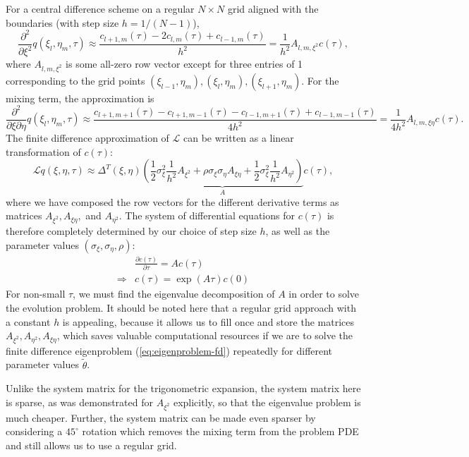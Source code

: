 \documentclass[10pt]{article}
\begin{document}
For a central difference scheme on a regular $N \times N$ grid aligned
with the boundaries (with step size $h=1/(N-1)$), 
\[
  \frac{\partial^2}{\partial \xi^2} q(\xi_l, \eta_m, \tau) \approx
  \frac{c_{l+1,m}(\tau) - 2c_{l,m}(\tau) + c_{l-1,m}(\tau)}{h^2} = \frac{1}{h^2}A_{l,m,\xi^2} c(\tau),
\]
where $A_{l,m,\xi^2}$ is some all-zero row vector except for three
entries of 1 corresponding to the grid points
$(\xi_{l-1}, \eta_m), (\xi_l,\eta_m), (\xi_{l+1},\eta_m)$. For the
mixing term, the approximation is
\[
  \frac{\partial^2}{\partial \xi \partial \eta} q(\xi_l, \eta_m, \tau) \approx
  \frac{c_{l+1,m+1}(\tau) - c_{l+1,m-1}(\tau) - c_{l-1,m+1}(\tau) + c_{l-1,m-1}(\tau)}{4h^2} = \frac{1}{4h^2}A_{l,m,\xi\eta} c(\tau).
\]
The finite difference approximation of $\mathcal{L}$ can be written as
a linear transformation of $c(\tau)$:
\[
  \mathcal{L}q(\xi,\eta,\tau) \approx \Delta^T(\xi,\eta) \underbrace{\left( \frac{1}{2}\sigma_\xi^2 \frac{1}{h^2}A_{\xi^2} + \rho\sigma_\xi\sigma_\eta A_{\xi\eta} + \frac{1}{2}\sigma_\xi^2 \frac{1}{h^2}A_{\eta^2}  \right)}_{A} c(\tau),
\]
where we have composed the row vectors for the different derivative
terms as matrices $A_{\xi^2}, A_{\xi\eta},$ and $A_{\eta^2}$. The
system of differential equations for $c(\tau)$ is therefore completely
determined by our choice of step size $h$, as well as the parameter
values $(\sigma_\xi, \sigma_\eta, \rho)$:
\begin{align}
   &\frac{\partial c(\tau)}{\partial \tau} = A c(\tau) \nonumber \\
   \Rightarrow &c(\tau) = \exp\left( A\tau \right)c(0) \label{eq:eigenproblem-fd}
\end{align}
For non-small $\tau$, we must find the eigenvalue decomposition of $A$
in order to solve the evolution problem. It should be noted here that
a regular grid approach with a constant $h$ is appealing, because it
allows us to fill once and store the matrices
$A_{\xi^2}, A_{\eta^2}, A_{\xi\eta}$, which saves valuable
computational resources if we are to solve the finite difference
eigenproblem (\ref{eq:eigenproblem-fd}) repeatedly for different
parameter values $\tilde{\theta}$.

Unlike the system matrix for the trigonometric expansion, the system
matrix here is sparse, as was demonstrated for $A_{\xi^2}$ explicitly,
so that the eigenvalue problem is much cheaper. Further, the system
matrix can be made even sparser by considering a $45^{\circ}$ rotation
which removes the mixing term from the problem PDE and still allows us
to use a regular grid.
\end{document}

